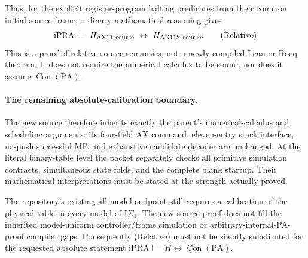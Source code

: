 Thus, for the explicit register-program halting predicates from their
common initial source frame, ordinary mathematical reasoning gives
\[
 \mathrm{iPRA}\ \vdash\
       H_{\rm AX11\ source}\ \leftrightarrow\
       H_{\rm AX11S\ source}.                               \tag{Relative}
\]
This is a proof of relative source semantics, not a newly compiled Lean
or Rocq theorem. It does not require the numerical calculus to be sound,
nor does it assume $\operatorname{Con}(\mathrm{PA})$.

\paragraph{The remaining absolute-calibration boundary.}
The new source therefore inherits exactly the parent's numerical-calculus
and scheduling arguments: its four-field AX command, eleven-entry stack
interface, no-push successful MP, and exhaustive candidate decoder are
unchanged. At the literal binary-table level the packet separately checks
all primitive simulation contracts, simultaneous state folds, and the
complete blank startup. Their mathematical interpretations must be stated
at the strength actually proved.

The repository's existing all-model endpoint still requires a calibration
of the physical table in every model of $\mathrm{I}\Sigma_1$. The new
source proof does not fill the inherited model-uniform controller/frame
simulation or arbitrary-internal-PA-proof compiler gaps. Consequently
(Relative) must not be silently substituted for the requested absolute
statement $\mathrm{iPRA}\vdash\neg H\leftrightarrow
\operatorname{Con}(\mathrm{PA})$.

